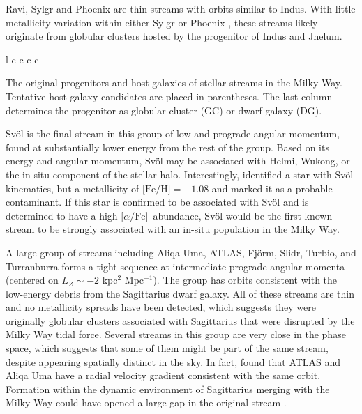 \documentclass[twocolumn]{aastex63}
\newcommand{\feh}{\ensuremath{\textrm{[Fe/H]}}}
\newcommand{\afe}{\ensuremath{\textrm{[$\alpha$/Fe]}}}
\begin{document}
Ravi, Sylgr and Phoenix are thin streams with orbits similar to Indus.
With little metallicity variation within either Sylgr or Phoenix \citep{ibata2019, wan2020}, these streams likely originate from globular clusters hosted by the progenitor of Indus and Jhelum.

\begin{deluxetable*}{l c c c c}
\decimals
\startdata

\enddata
\caption{
The original progenitors and host galaxies of stellar streams in the Milky Way.
Tentative host galaxy candidates are placed in parentheses.
The last column determines the progenitor as globular cluster (GC) or dwarf galaxy (DG).
}
\label{table}
\end{deluxetable*}


Sv\" ol is the final stream in this group of low and prograde angular momentum, found at substantially lower energy from the rest of the group.
Based on its energy and angular momentum, Sv\" ol may be associated with Helmi, Wukong, or the in-situ component of the stellar halo.
Interestingly, \citet{ibata2019} identified a star with Sv\" ol kinematics, but a metallicity of $\feh=-1.08$ and marked it as a probable contaminant.
If this star is confirmed to be associated with Sv\" ol and is determined to have a high \afe\ abundance, Sv\" ol would be the first known stream to be strongly associated with an in-situ population in the Milky Way. 

A large group of streams including Aliqa Uma, ATLAS, Fj\" orm, Slidr, Turbio, and Turranburra forms a tight sequence at intermediate prograde angular momenta (centered on $L_Z\sim-2$ kpc$^2$ Mpc$^{-1}$).
The group has orbits consistent with the low-energy debris from the Sagittarius dwarf galaxy.
All of these streams are thin and no metallicity spreads have been detected, which suggests they were originally globular clusters associated with Sagittarius that were disrupted by the Milky Way tidal force.
Several streams in this group are very close in the phase space, which suggests that some of them might be part of the same stream, despite appearing spatially distinct in the sky.
In fact, \citet{li2020} found that ATLAS and Aliqa Uma have a radial velocity gradient consistent with the same orbit.
Formation within the dynamic environment of Sagittarius merging with the Milky Way could have opened a large gap in the original stream \citep{bonaca2020b, deboer2020}.
\end{document}
